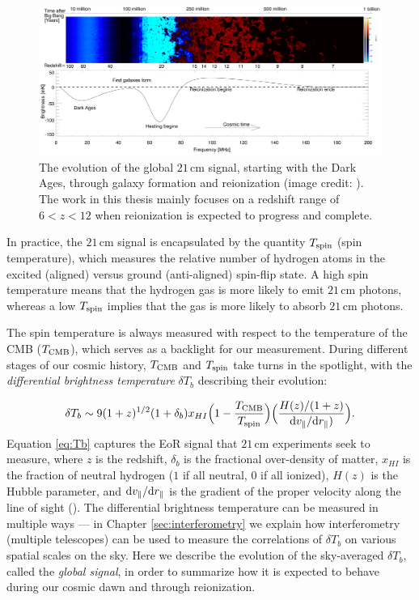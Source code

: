 \begin{figure}
	\centering
	\includegraphics[width=\columnwidth]{plots/timeline_global.pdf}
	\caption{The evolution of the global $21$\,cm signal, starting with the Dark Ages, through galaxy formation and reionization (image credit: \citet{pritchard_loeb2012}). The work in this thesis mainly focuses on a redshift range of $6 < z < 12$ when reionization is expected to progress and complete.}
	\label{fig:timeline_global}
\end{figure}

In practice, the $21$\,cm signal is encapsulated by the quantity $T_{\rm spin}$ (spin temperature), which measures the relative number of hydrogen atoms in the excited (aligned) versus ground (anti-aligned) spin-flip state. A high spin temperature means that the hydrogen gas is more likely to emit $21$\,cm photons, whereas a low $T_{\rm spin}$ implies that the gas is more likely to absorb $21$\,cm photons. 

The spin temperature is always measured with respect to the temperature of the CMB ($T_{\rm CMB}$), which serves as a backlight for our measurement. During different stages of our cosmic history, $T_{\rm CMB}$ and $T_{\rm spin}$ take turns in the spotlight, with the \textit{differential brightness temperature} $\delta T_{b}$ describing their evolution:

\begin{equation}
\label{eq:Tb}
\delta T_{b} \sim 9(1+z)^{1/2}(1+\delta_{b})x_{HI}\Big(1-\frac{T_{\rm CMB}}{T_{\rm spin}}\Big)\Big(\frac{H(z)/(1+z)}{{\rm d}v_{\parallel}/{\rm d}r_{\parallel})}\Big).
\end{equation}
Equation \eqref{eq:Tb} captures the EoR signal that $21$\,cm experiments seek to measure, where $z$ is the redshift, $\delta_{b}$ is the fractional over-density of matter, $x_{HI}$ is the fraction of neutral hydrogen ($1$ if all neutral, $0$ if all ionized), $H(z)$ is the Hubble parameter, and ${\rm d}v_{\parallel}/{\rm d}r_{\parallel}$ is the gradient of the proper velocity along the line of sight (\citealt{furlanetto_et_al2006}). The differential brightness temperature can be measured in multiple ways --- in Chapter \ref{sec:interferometry} we explain how interferometry (multiple telescopes) can be used to measure the correlations of $\delta T_{b}$ on various spatial scales on the sky. Here we describe the evolution of the sky-averaged $\delta T_{b}$, called the \textit{global signal}, in order to summarize how it is expected to behave during our cosmic dawn and through reionization.

